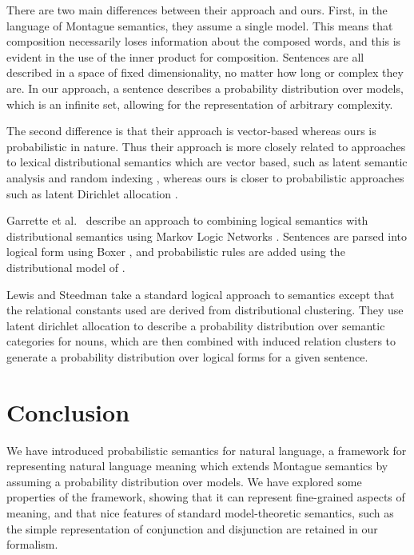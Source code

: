 \documentclass{svmult}
\begin{document}
There are two main differences between their approach and ours. First,
in the language of Montague semantics, they assume a single
model. This means that composition necessarily loses information about
the composed words, and this is evident in the use of the inner
product for composition. Sentences are all described in a space of
fixed dimensionality, no matter how long or complex they are. In our
approach, a sentence describes a probability distribution over models,
which is an infinite set, allowing for the representation of arbitrary
complexity.

The second difference is that their approach is vector-based whereas
ours is probabilistic in nature. Thus their approach is more
closely related to approaches to lexical distributional semantics
which are vector based, such as latent semantic analysis
\cite{Deerwester:90} and random indexing \cite{Sahlgren:02}, whereas
ours is closer to probabilistic approaches such as latent Dirichlet
allocation \cite{Blei:03}.

Garrette et al.~\cite{Garrette:11} describe an approach to combining logical
semantics with distributional semantics using Markov Logic Networks
\cite{Richardson:06}. Sentences are parsed into logical form using
Boxer \cite{Bos:04}, and probabilistic rules are added using the
distributional model of \cite{Erk:10}.

Lewis and Steedman \cite{Lewis:13} take a standard logical approach to
semantics except that the relational constants used are derived from
distributional clustering. They use latent dirichlet allocation to
describe a probability distribution over semantic categories for
nouns, which are then combined with induced relation clusters to
generate a probability distribution over logical forms for a given
sentence.

\section{Conclusion}

We have introduced probabilistic semantics for natural language, a
framework for representing natural language meaning which extends
Montague semantics by assuming a probability distribution over
models. We have explored some properties of the framework, showing
that it can represent fine-grained aspects of meaning, and that nice
features of standard model-theoretic semantics, such as the simple
representation of conjunction and disjunction are retained in our
formalism.
\end{document}
